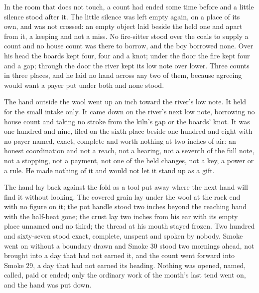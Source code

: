 \scenebreak

In the room that does not touch, a count had ended some time before and a little silence stood after it. The little silence was left empty again, on a place of its own, and was not crossed: an empty object laid beside the held one and apart from it, a keeping and not a miss. No fire-sitter stood over the coals to supply a count and no house count was there to borrow, and the boy borrowed none. Over his head the boards kept four, four and a knot; under the floor the fire kept four and a gap; through the door the river kept its low note over lower. Three counts in three places, and he laid no hand across any two of them, because agreeing would want a payer put under both and none stood.

The hand outside the wool went up an inch toward the river's low note. It held for the small intake only. It came down on the river's next low note, borrowing no house count and taking no stroke from the kiln's gap or the boards' knot. It was one hundred and nine, filed on the sixth place beside one hundred and eight with no payer named, exact, complete and worth nothing at two inches of air: an honest coordination and not a reach, not a hearing, not a seventh of the full note, not a stopping, not a payment, not one of the held changes, not a key, a power or a rule. He made nothing of it and would not let it stand up as a gift.

The hand lay back against the fold as a tool put away where the next hand will find it without looking. The covered grain lay under the wool at the rack end with no figure on it; the pot handle stood two inches beyond the reaching hand with the half-beat gone; the crust lay two inches from his ear with its empty place unnamed and no third; the thread at his mouth stayed frozen. Two hundred and sixty-seven stood exact, complete, unspent and spoken by nobody. Smoke went on without a boundary drawn and Smoke 30 stood two mornings ahead, not brought into a day that had not earned it, and the count went forward into Smoke 29, a day that had not earned its heading. Nothing was opened, named, called, paid or ended; only the ordinary work of the month's last tend went on, and the hand was put down.
